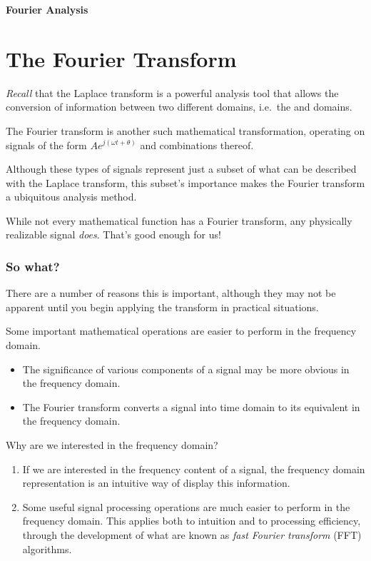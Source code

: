 \documentclass[11pt]{report}
\begin{document}
\setcounter{page}{1}
\setcounter{equation}{0}
\setcounter{figure}{0}
\begin{center}
\Large{\textbf{Fourier Analysis}}
\normalsize
\end{center}

\section*{The Fourier Transform}

\textit{Recall} that the Laplace transform is a powerful analysis tool
that allows the conversion of information between two different
domains, i.e.\ the  and  domains.

The Fourier transform is another such mathematical
transformation, operating on signals of the form $Ae^{j(\omega t +\theta)}$ and combinations thereof.

Although these types of signals represent just
a subset of what can be described with the Laplace transform, this
subset's importance makes the Fourier transform a ubiquitous analysis
method. 

While not every mathematical function has a Fourier transform, any
physically realizable signal \textit{does}.  That's good enough for us!

\subsubsection*{So what?}

There are a number of reasons this is important, although they may not
be apparent until you begin applying the transform in practical
situations.

Some important mathematical operations are easier to perform in the
frequency domain.

\begin{itemize}
\item The significance of various components of a signal may be more obvious
in the frequency domain.
\item The Fourier transform converts a signal into time domain to its
equivalent in the frequency domain.
\end{itemize}

Why are we interested in the frequency domain?

\begin{enumerate}
\item If we are interested in the frequency content of a signal, the
frequency domain representation is an intuitive way of display this
information.
\item Some useful signal processing operations are much easier to perform
in the frequency domain. This applies both to intuition and to
processing efficiency, through the development of what are known as
\textit{fast Fourier transform} (FFT)
algorithms.
\end{enumerate}
\end{document}
